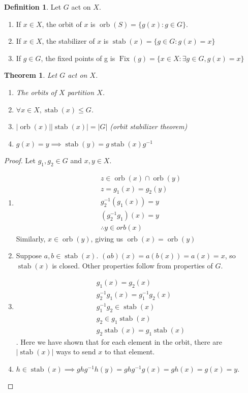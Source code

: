 \documentclass{article}
\theoremstyle{definition}
\newtheorem{definition}{Definition}
\theoremstyle{plain}
\newtheorem{theorem}{Theorem}
\theoremstyle{corollary}
\theoremstyle{lemma}
\DeclareMathOperator{\orb}{orb}
\DeclareMathOperator{\stab}{stab}
\DeclareMathOperator{\Fix}{Fix}
\begin{document}
\begin{definition}
    Let $G$ act on $X$.
    \begin{enumerate}
        \item If $x\in X$, the orbit of $x$ is $\orb(S)=\{g(x):g\in G\}$.
        \item If $x\in X$, the stabilizer of $x$ is $\stab(x)=\{g\in G:g(x)=x\}$
        \item If $g\in G$, the fixed points of g is $\Fix(g)=\{x\in X:\exists g\in G,g(x)=x\}$
    \end{enumerate}
\end{definition}

\begin{theorem}
    Let $G$ act on $X$.
    \begin{enumerate}
        \item The orbits of $X$ partition $X$.
        \item $\forall x\in X,\stab(x)\leq G$.
        \item $|\orb(x)||\stab(x)|=|G|$ (orbit stabilizer theorem)
        \item $g(x)=y\implies \stab(y)=g\stab(x)g^{-1}$
    \end{enumerate}
\end{theorem}

\begin{proof}
    Let $g_1,g_2\in G$ and $x,y\in X$.
    \begin{enumerate}
        \item \begin{align}
            &z\in\orb(x)\cap\orb(y)\\
            &z=g_1(x)=g_2(y)\\
            &g_2^{-1}(g_1(x))=y\\
            &(g_2^{-1}g_1)(x)=y\\
            &\therefore y\in orb(x)
        \end{align} Similarly, $x\in\orb(y)$, giving us $\orb(x)=\orb(y)$
        \item Suppose $a,b\in\stab(x)$. $(ab)(x)=a(b(x))=a(x)=x$, so $\stab(x)$ is closed. Other properties follow from properties of $G$.
        \item \begin{align}
            & g_1(x)=g_2(x)\\
            & g_2^{-1}g_1(x)=g_1^{-1}g_2(x)\\
            & g_1^{-1}g_2\in\stab(x)\\
            & g_2\in g_1\stab(x)\\
            & g_2\stab(x)=g_1\stab(x)
        \end{align}. Here we have shown that for each element in the orbit, there are $|\stab(x)|$ ways to send $x$ to that element.
        \item $h\in\stab(x)\implies ghg^{-1}h(y)=ghg^{-1}g(x)=gh(x)=g(x)=y$.
    \end{enumerate}
\end{proof}
\end{document}
